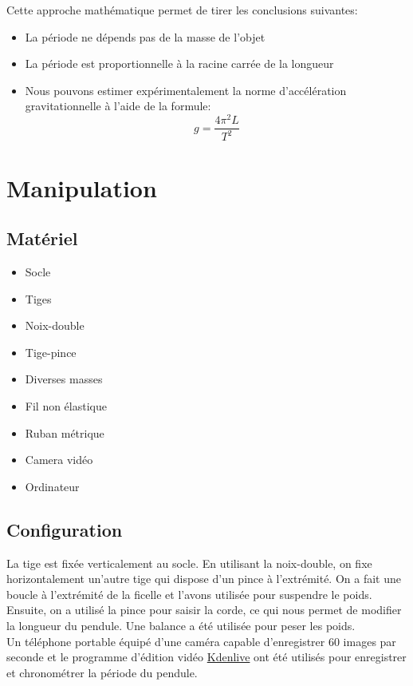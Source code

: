 \documentclass[12pt,a4paper]{article}
\begin{document}
    Cette approche mathématique permet de tirer les conclusions suivantes:
    \begin{itemize}
        \item La période ne dépends pas de la masse de l'objet
        \item La période est proportionnelle à la racine carrée de la longueur
        \item Nous pouvons estimer expérimentalement la norme d'accélération gravitationnelle à l'aide de la formule: 
        \begin{equation*}
            g=\frac{4\pi^2L}{T^2}
        \end{equation*}
    \end{itemize}

    \section{Manipulation}
    \subsection{Matériel}
    \begin{minipage}{0.5\textwidth}
        \begin{itemize}
            \item Socle
            \item Tiges
            \item Noix-double
            \item Tige-pince
            \item Diverses masses
        \end{itemize}
    \end{minipage}
    \begin{minipage}{0.5\textwidth}
        \begin{itemize}
            \item Fil non élastique
            \item Ruban métrique
            \item Camera vidéo
            \item Ordinateur
        \end{itemize}
    \end{minipage}
    \subsection{Configuration}
    La tige est fixée verticalement au socle. En utilisant la noix-double, on fixe horizontalement un'autre tige qui dispose d'un pince à l'extrémité. On a fait une boucle à l'extrémité de la ficelle et l'avons utilisée pour suspendre le poids.
    Ensuite, on a utilisé la pince pour saisir la corde, ce qui nous permet de modifier la longueur du pendule. Une balance a été utilisée pour peser les poids. \\
    Un téléphone portable équipé d'une caméra capable d'enregistrer 60 images par seconde et le programme d'édition vidéo \href{https://kdenlive.org}{Kdenlive} ont été utilisés pour enregistrer et chronométrer la période du pendule. \\
\end{document}
